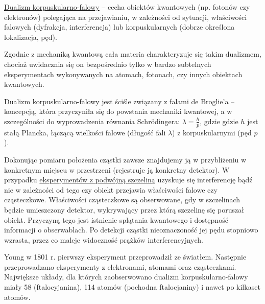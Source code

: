 \underline{Dualizm korpuskularno-falowy} – cecha obiektów kwantowych (np. fotonów czy elektronów) polegająca na przejawianiu, w zależności od sytuacji, właściwości falowych (dyfrakcja, interferencja) lub korpuskularnych (dobrze określona lokalizacja, pęd).

Zgodnie z mechaniką kwantową cała materia charakteryzuje się takim dualizmem, chociaż uwidacznia się on bezpośrednio tylko w bardzo subtelnych eksperymentach wykonywanych na atomach, fotonach, czy innych obiektach kwantowych.

Dualizm korpuskularno-falowy jest ściśle związany z falami de Broglie’a – koncepcją, która przyczyniła się do powstania mechaniki kwantowej, a w szczególności do wyprowadzenia równania Schrödingera: $ \lambda = \frac{h}{p} $, gdzie gdzie $ h $ jest stałą Plancka, łączącą wielkości falowe (długość fali $ \lambda $) z korpuskularnymi (pęd $ p $).

Dokonując pomiaru położenia cząstki zawsze znajdujemy ją w przybliżeniu w konkretnym miejscu w przestrzeni (rejestruje ją konkretny detektor). W przypadku \underline{eksperymentów z podwójną szczeliną} uzyskuje się interferencję bądź nie w zależności od tego czy obiekt przejawia właściwości falowe czy cząsteczkowe. Właściwości cząsteczkowe są obserwowane, gdy w szczelinach będzie umieszczony detektor, wykrywający przez którą szczelinę się poruszał obiekt. Przyczyną tego jest istnienie splątania kwantowego i dostępność informacji o obserwablach. Po detekcji cząstki nieoznaczoność jej pędu stopniowo wzrasta, przez co maleje widoczność prążków interferencyjnych.

Young w 1801 r. pierwszy eksperyment przeprowadził ze światłem. Następnie przeprowadzano eksperymenty z elektronami, atomami oraz cząsteczkami. Największe układy, dla których zaobserwowano dualizm korpuskularno-falowy miały 58 (ftalocyjanina), 114 atomów (pochodna ftalocjaniny) i nawet po kilkaset atomów.

